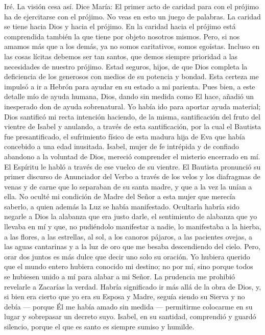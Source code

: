 \documentclass[12pt]{book} %
\begin{document}
Iré. 
La visión cesa así. 
Dice María:                           
El primer acto de caridad para con el prójimo ha de ejercitarse con el prójimo. No veas en esto un juego de palabras. La caridad se tiene hacia Dios y hacia el prójimo. En la caridad hacia el prójimo está comprendida también la que tiene por objeto nosotros mismos. Pero, si nos amamos más que a los demás, ya no somos caritativos, somos egoístas. Incluso en las cosas lícitas debemos ser tan santos, que demos siempre prioridad a las necesidades de nuestro prójimo. Estad seguros, hijos, de que Dios completa la deficiencia de los generosos con medios de su potencia y bondad. 
Esta certeza me impulsó a ir a Hebrón para ayudar en su estado a mi parienta. Pues bien, a este detalle mío de ayuda humana, Dios, dando sin medida como El hace, añadió un inesperado don de ayuda sobrenatural. Yo había ido para aportar ayuda material; Dios santificó mi recta intención haciendo, de la misma, santificación del fruto del vientre de Isabel y anulando, a través de esta santificación, por la cual el Bautista fue presantificado, el sufrimiento físico de esta madura hija de Eva que había concebido a una edad inusitada. 
Isabel, mujer de fe intrépida y de confiado abandono a la voluntad de Dios, mereció comprender el misterio encerrado 
en mí. El Espíritu le habló a través de ese vuelco de su vientre. El Bautista pronunció su primer discurso de Anunciador del Verbo a través de los velos y los diafragmas de venas y de carne que lo separaban de su santa madre, y que a la vez la unían a ella. 
No oculté mi condición de Madre del Señor a esta mujer que merecía saberlo, a quien además la Luz se había 
manifestado. Ocultarla habría sido negarle a Dios la alabanza que era justo darle, el sentimiento de alabanza que yo llevaba en mí y que, no pudiéndolo manifestar a nadie, lo manifestaba a la hierba, a las flores, a las estrellas, al sol, a los canoros pájaros, a las pacientes ovejas, a las aguas cantarinas y a la luz de oro que me besaba descendiendo del cielo. Pero, orar dos juntos es más dulce que decir uno solo su oración. Yo hubiera querido que el mundo entero hubiera conocido mi destino; no por mí, sino porque todos se hubiesen unido a mí para alabar a mi Señor. 
La prudencia me prohibió revelarle a Zacarías la verdad. Habría significado ir más allá de la obra de Dios, y, si bien era cierto que yo era su Esposa y Madre, seguía siendo su Sierva y no debía — porque Él me había amado sin medida — permitirme colocarme en su lugar y sobrepasar un decreto suyo. 
Isabel, en su santidad, comprendió y guardó silencio, porque el que es santo es siempre sumiso y humilde. 
\end{document}
